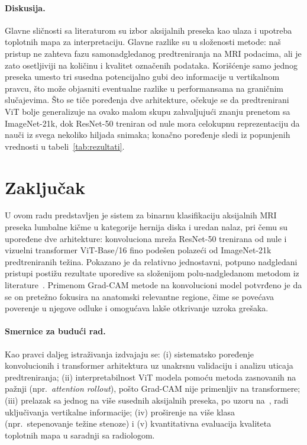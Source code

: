 \documentclass[12pt,a4paper]{article}
\begin{document}
\paragraph{Diskusija.}
Glavne sličnosti sa literaturom su izbor aksijalnih preseka kao ulaza i upotreba
toplotnih mapa za interpretaciju. Glavne razlike su u složenosti metode: naš pristup ne
zahteva fazu samonadgledanog predtreniranja na MRI podacima, ali je zato osetljiviji na
količinu i kvalitet označenih podataka. Korišćenje samo jednog preseka umesto tri susedna
potencijalno gubi deo informacije u vertikalnom pravcu, što može objasniti eventualne
razlike u performansama na graničnim slučajevima. Što se tiče poređenja dve arhitekture,
očekuje se da predtrenirani ViT bolje generalizuje na ovako malom skupu zahvaljujući
znanju prenetom sa ImageNet-21k, dok ResNet-50 treniran od nule mora celokupnu
reprezentaciju da nauči iz svega nekoliko hiljada snimaka; konačno poređenje sledi iz
popunjenih vrednosti u tabeli~\ref{tab:rezultati}.

\section{Zaključak}
\label{sec:zakljucak}

U ovom radu predstavljen je sistem za binarnu klasifikaciju aksijalnih MRI preseka
lumbalne kičme u kategorije hernija diska i uredan nalaz, pri čemu su upoređene dve
arhitekture: konvoluciona mreža ResNet-50 trenirana od nule i vizuelni transformer
ViT-Base/16 fino podešen polazeći od ImageNet-21k predtreniranih težina. Pokazano je da
relativno jednostavni, potpuno nadgledani pristupi postižu rezultate uporedive sa
složenijom polu-nadgledanom metodom iz literature~\cite{hou2023mri}. Primenom Grad-CAM
metode na konvolucioni model potvrđeno je da se on pretežno fokusira na anatomski
relevantne regione, čime se povećava poverenje u njegove odluke i omogućava lakše
otkrivanje uzroka grešaka.

\paragraph{Smernice za budući rad.}
Kao pravci daljeg istraživanja izdvajaju se: (i) sistematsko poređenje konvolucionih i
transformer arhitektura uz unakrsnu validaciju i analizu uticaja predtreniranja;
(ii) interpretabilnost ViT modela pomoću metoda zasnovanih na pažnji (npr.\ \textit{attention
rollout}), pošto Grad-CAM nije primenljiv na transformere; (iii) prelazak sa jednog na
više susednih aksijalnih preseka, po uzoru na~\cite{hou2023mri}, radi uključivanja
vertikalne informacije; (iv) proširenje na više klasa (npr.\ stepenovanje težine stenoze)
i (v) kvantitativna evaluacija kvaliteta toplotnih mapa u saradnji sa radiologom.
\end{document}

